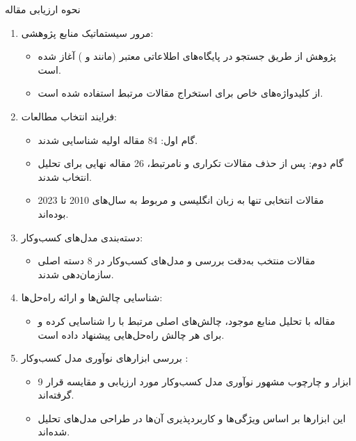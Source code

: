 \documentclass[10pt, twocolumn]{article}
\begin{document}
 نحوه ارزیابی مقاله  
\begin{enumerate}
\item 
مرور سیستماتیک منابع پژوهشی: 
\begin{itemize}
\item 
پژوهش از طریق جستجو در پایگاه‌های اطلاعاتی معتبر (مانند  و ) آغاز شده است.  
\item 
از کلیدواژه‌های خاص برای استخراج مقالات مرتبط استفاده شده است.  
\end{itemize} 

\item 
فرایند انتخاب مطالعات:  
\begin{itemize}
\item گام اول: 84 مقاله اولیه شناسایی شدند.  
\item گام دوم: پس از حذف مقالات تکراری و نامرتبط، 26 مقاله نهایی برای تحلیل انتخاب شدند.  
\item مقالات انتخابی تنها به زبان انگلیسی و مربوط به سال‌های 2010 تا 2023 بوده‌اند.  
\end{itemize}

\item 
دسته‌بندی مدل‌های کسب‌وکار:  
\begin{itemize}
\item مقالات منتخب به‌دقت بررسی و مدل‌های کسب‌وکار  در 8 دسته اصلی سازمان‌دهی شدند.  
\end{itemize}

\item
شناسایی چالش‌ها و ارائه راه‌حل‌ها: 
\begin{itemize}
\item مقاله با تحلیل منابع موجود، چالش‌های اصلی مرتبط با  را شناسایی کرده و برای هر چالش راه‌حل‌هایی پیشنهاد داده است.  
\end{itemize} 

\item 
بررسی ابزارهای نوآوری مدل کسب‌وکار :  

\begin{itemize}
\item 9 ابزار و چارچوب مشهور نوآوری مدل کسب‌وکار مورد ارزیابی و مقایسه قرار گرفته‌اند.  
\item این ابزارها بر اساس ویژگی‌ها و کاربردپذیری آن‌ها در طراحی مدل‌های  تحلیل شده‌اند.  
\end{itemize}

\end{enumerate}
\end{document}
